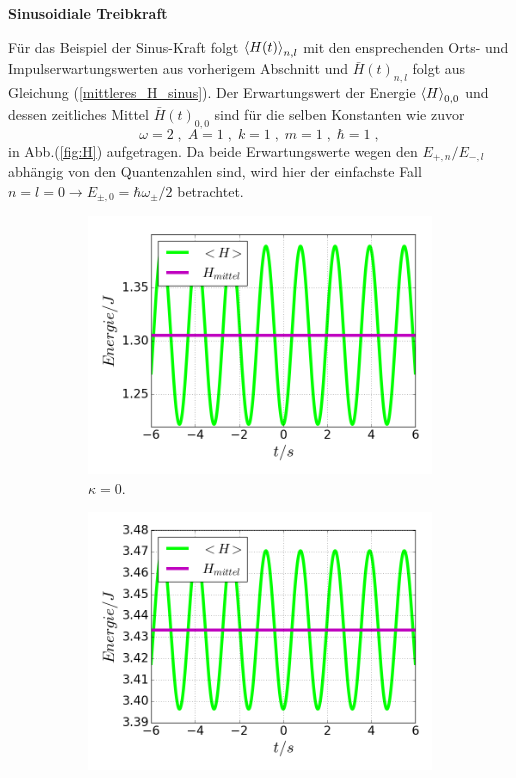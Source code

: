     \textbf{Sinusoidiale Treibkraft}

    Für das Beispiel der Sinus-Kraft folgt $\braket{H(t)}_{n,l}$ mit den ensprechenden Orts- und Impulserwartungswerten aus vorherigem Abschnitt und  $\bar H(t)_{n,l}$ folgt aus Gleichung (\ref{mittleres_H_sinus}).
    Der Erwartungswert der Energie $\braket H_{0,0}$ und dessen zeitliches Mittel $\bar H(t)_{0,0}$ sind für die selben Konstanten wie zuvor
    \begin{equation}
      \omega=2 \;,\; A=1 \;,\; k=1 \;,\; m=1 \;,\; \hbar=1 \; ,
    \end{equation}
    in Abb.(\ref{fig:H}) aufgetragen.
    Da beide Erwartungswerte wegen den $E_{+,n}/E_{-,l}$ abhängig von den Quantenzahlen sind, wird hier der einfachste Fall $n=l=0 \rightarrow E_{\pm,0}=\hbar \omega_\pm/2$ betrachtet.
\iffalse
    \begin{figure}
      \begin{subfigure}[t]{0.5\textwidth}
        \centering
        \includegraphics[width=\textwidth]{plots/<H>00_kappa0.png}
        \caption{$\kappa=0$.}
        \label{fig:H_kappa0}
      \end{subfigure}
      \quad
      \begin{subfigure}[t]{0.5\textwidth}
          \centering
          \includegraphics[width=\textwidth]{plots/<H>00_kappa15.png}

\end{subfigure}
\end{figure}
